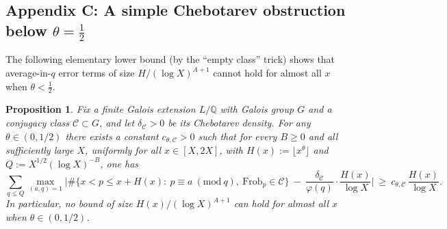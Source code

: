 \documentclass[11pt]{amsart}
\newtheorem{proposition}[theorem]{Proposition}
\theoremstyle{definition}
\theoremstyle{remark}
\numberwithin{equation}{section}
\begin{document}
\subsection*{Appendix C: A simple Chebotarev obstruction below $\theta=\tfrac12$}
The following elementary lower bound (by the ``empty class'' trick) shows that average-in-$q$ error terms of size $H/( \log X)^{A+1}$ cannot hold for almost all $x$ when $\theta<\tfrac12$.

\begin{proposition}\label{prop:cheb}
Fix a finite Galois extension $L/\mathbb{Q}$ with Galois group $G$ and a conjugacy class $\mathcal{C}\subset G$, and let $\delta_{\mathcal C}>0$ be its Chebotarev density. For any $\theta\in(0,1/2)$ there exists a constant $c_{\theta,\mathcal C}>0$ such that for every $B\ge 0$ and all sufficiently large $X$, uniformly for all $x\in[X,2X]$, with $H(x):=\lfloor x^{\theta}\rfloor$ and $Q:=X^{1/2}(\log X)^{-B}$, one has
\[
 \sum_{q\le Q}\max_{(a,q)=1}\Big|\#\{x<p\le x+H(x):\ p\equiv a\ (\mathrm{mod}\ q),\ \mathrm{Frob}_p\in\mathcal{C}\}\ 
-\ \frac{\delta_{\mathcal C}}{\varphi(q)}\cdot\frac{H(x)}{\log X}\Big|\ \ge\ c_{\theta, \mathcal C}\,\frac{H(x)}{\log X}.
\]
In particular, no bound of size $H(x)/(\log X)^{A+1}$ can hold for almost all $x$ when $\theta\in(0,1/2)$.
\end{proposition}
\end{document}
